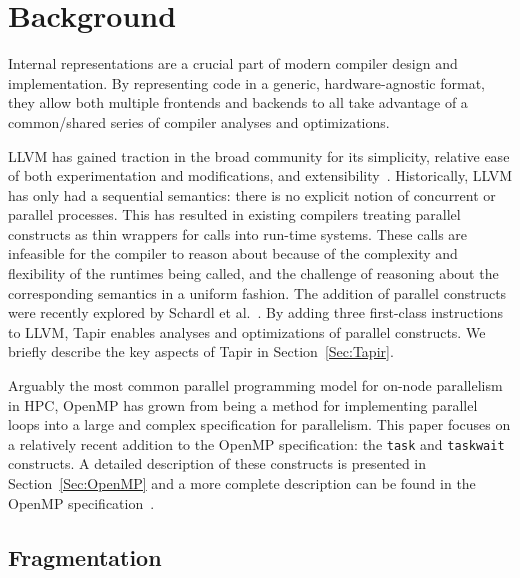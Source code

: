 \documentclass[sigconf]{acmart}
\begin{document}
\section{Background} \label{Sec:Background}

Internal representations are a crucial part of modern compiler design and implementation.  By
representing code in a generic, hardware-agnostic format, they allow both
multiple frontends and backends to all take advantage of a common/shared series of compiler 
analyses and optimizations. 

LLVM has gained traction in the broad community for its simplicity,
relative ease of both experimentation and modifications, and extensibility~\cite{lattner2004llvm}.
Historically, LLVM has only had a sequential semantics: there is no explicit notion
of concurrent or parallel processes. This has resulted in existing compilers
treating parallel constructs as thin wrappers for calls into run-time
systems. These calls are infeasible for the compiler to reason about because of
the complexity and flexibility of the runtimes being called, and the challenge
of reasoning about the corresponding semantics in a uniform fashion. The
addition of parallel constructs were recently explored by Schardl et
al.~\cite{tapir}. By adding three first-class instructions to LLVM, Tapir
enables analyses and optimizations of parallel constructs. We briefly describe
the key aspects of Tapir in Section~\ref{Sec:Tapir}.

Arguably the most common parallel programming model for on-node parallelism
in HPC, OpenMP has grown from being a method for implementing parallel loops into a
large and complex specification for parallelism. This paper focuses on a 
relatively recent addition to the OpenMP specification: the \texttt{task}
and \texttt{taskwait} constructs. A detailed description of these constructs
is presented in Section~\ref{Sec:OpenMP} and a more complete description can 
be found in the OpenMP specification~\cite{openmp}.

\subsection{Fragmentation}
\end{document}
